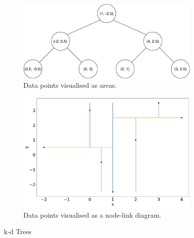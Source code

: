 \documentclass[a4paper]{article}
\begin{document}
\begin{figure}[!hb]
\begin{subfigure}[t]{.4\textwidth}
	\end{subfigure}
	\begin{subfigure}[t]{.4\textwidth}
		\includegraphics[width=\textwidth]{kd-tree2.pdf}
		\caption{Data points visualised as areas.}
		\label{3}
	\end{subfigure}
	\begin{subfigure}[t]{.4\textwidth}
		\includegraphics[width=\linewidth]{2dtree_nodelink2.pdf}
		\caption{Data points visualised as a node-link diagram.}
		\label{4}
	\end{subfigure}
	\caption{k-d Trees}
	\label{kdtree}
\end{figure}
\end{document}
